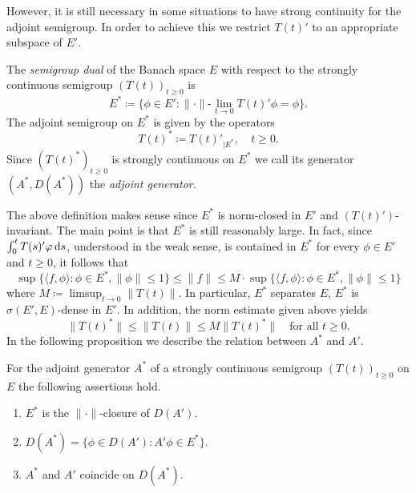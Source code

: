 However, it is still necessary in some situations to have strong continuity for the adjoint semigroup.
In order to achieve this we restrict $T(t)'$ to an appropriate subspace of\/ $E'$.
\begin{definition*}\label{def:a1-3.1}
The \emph{semigroup dual} of the Banach space $E$ with respect to the strongly continuous semigroup $(T(t))_{t \geq 0}$ is
\[
    E^{*} \coloneq \{\phi \in E' \colon \|\cdot\|\text{-}\lim_{t \to 0} T(t)'\phi = \phi\}.
\]
The adjoint semigroup on $E^{*}$ is given by the operators
\[
    T(t)^{*} \coloneq T(t)'_{ \vert E^{*}}, \quad t \geq 0.
\]
Since $(T(t)^{*})_{t \geq 0}$ is strongly continuous on $E^{*}$ we call its generator $(A^{*},D(A^{*}))$ the \emph{adjoint generator}.
\end{definition*}
The above definition makes sense since $E^{*}$ is norm-closed in $E'$ and $(T(t)')$-invariant.
The main point is that $E^{*}$ is still reasonably large.
In fact, since $\int_{0}^{t} T(s)'\phi  \ds$, understood in the weak sense, is contained in $E^{*}$ for every $\phi \in E'$ and $t \geq 0$, it follows that
\[
    \sup\{\langle f,\phi \rangle \colon \phi \in E^{*}, \|\phi\| \leq 1\} \leq \|f\| \leq M\cdot\sup\{\langle f,\phi \rangle \colon \phi \in E^{*}, \|\phi\| \leq1\}
\]
where $M \coloneq \limsup_{t \to 0} \|T(t)\|$.
In particular, $E^{*}$ separates $E$, \ie $E^{*}$ is $\sigma(E',E)$-dense in $E'$.
In addition, the norm estimate given above yields
\[
    \|T(t)^{*}\| \leq \|T(t)\| \leq M\|T(t)^{*}\| \quad \text{for all } t \geq 0.
\]
In the following proposition we describe the relation between $A^{*}$ and $A'$.
\begin{proposition*}\label{prop:a1-3.4}
For the adjoint generator $A^{*}$ of a strongly continuous semigroup $(T(t))_{t \geq 0}$ on $E$ the following assertions hold.
\begin{enumerate}[\upshape(i)]
\item 
$E^{*}$ is the $\|\cdot\|$-closure of\/ $D(A')$.

\item 
$D(A^{*}) = \{\phi \in D(A') \colon A'\phi \in E^{*}\}$.

\item 
$A^{*}$ and $A'$ coincide on $D(A^{*})$.
\end{enumerate}
\end{proposition*}
